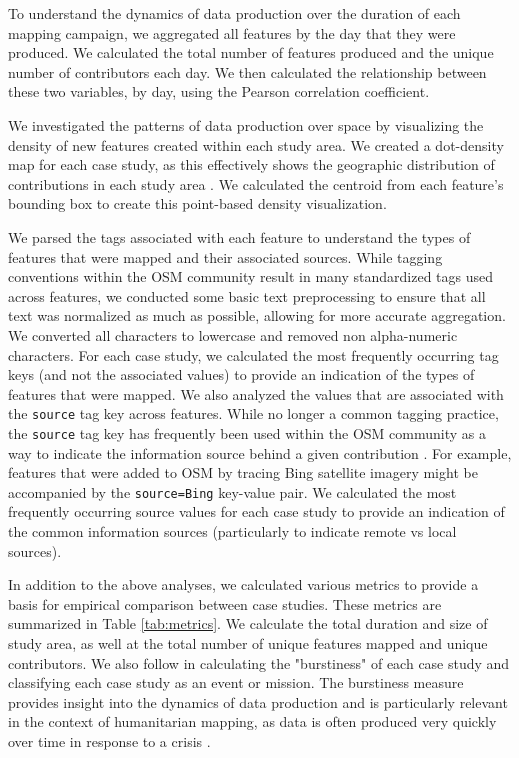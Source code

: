 To understand the dynamics of data production over the duration of each mapping campaign, we aggregated all features by the day that they were produced. We calculated the total number of features produced and the unique number of contributors each day. We then calculated the relationship between these two variables, by day, using the Pearson correlation coefficient. 

We investigated the patterns of data production over space by visualizing the density of new features created within each study area. We created a dot-density map for each case study, as this effectively shows the geographic distribution of contributions in each study area \parencite{kimerling_dotting_2009}. We calculated the centroid from each feature's bounding box to create this point-based density visualization. 

We parsed the tags associated with each feature to understand the types of features that were mapped and their associated sources. While tagging conventions within the OSM community result in many standardized tags used across features, we conducted some basic text preprocessing to ensure that all text was normalized as much as possible, allowing for more accurate aggregation. We converted all characters to lowercase and removed non alpha-numeric characters. For each case study, we calculated the most frequently occurring tag keys (and not the associated values) to provide an indication of the types of features that were mapped. We also analyzed the values that are associated with the \texttt{source} tag key across features. While no longer a common tagging practice, the \texttt{source} tag key has frequently been used within the OSM community as a way to indicate the information source behind a given contribution \parencite{noauthor_keysource_2020}. For example, features that were added to OSM by tracing Bing satellite imagery might be accompanied by the \texttt{source=Bing} key-value pair. We calculated the most frequently occurring source values for each case study to provide an indication of the common information sources (particularly to indicate remote vs local sources). 

In addition to the above analyses, we calculated various metrics to provide a basis for empirical comparison between case studies. These metrics are summarized in Table \ref{tab:metrics}. We calculate the total duration and size of study area, as well at the total number of unique features mapped and unique contributors. We also follow \textcite{dittus_mass_2017} in calculating the "burstiness" of each case study and classifying each case study as an event or mission. The burstiness measure provides insight into the dynamics of data production and is particularly relevant in the context of humanitarian mapping, as data is often produced very quickly over time in response to a crisis \parencite{dittus_mass_2017}. 


